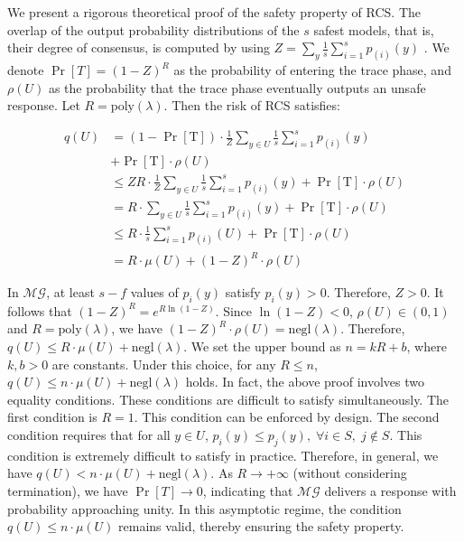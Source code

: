 We present a rigorous theoretical proof of the safety property of RCS. The overlap of the output probability distributions of the $s$ safest models, that is, their degree of consensus, is computed by using $Z = \sum_{y}\frac{1}{s}\sum_{i=1}^{s}p_{(i)}(y)$ \citep{kalai2025consensus}. We denote $\Pr[T]=(1-Z)^R$ as the probability of entering the trace phase, and $\rho(U)$ as the probability that the trace phase eventually outputs an unsafe response. Let $R = \mathrm{poly}(\lambda)$. Then the risk of RCS satisfies:

\begin{align*}
q(U) &= (1-\Pr[\text{T}]) \cdot \frac{1}{Z} \sum_{y \in U}\frac{1}{s}\sum_{i=1}^{s}p_{(i)}(y) \\ &+ \Pr[\text{T}] \cdot \rho(U)\\
&\leq  ZR \cdot \frac{1}{Z} \sum_{y \in U}\frac{1}{s}\sum_{i=1}^{s}p_{(i)}(y) + \Pr[\text{T}] \cdot \rho(U)\\
&=  R \cdot \sum_{y \in U}\frac{1}{s}\sum_{i=1}^{s}p_{(i)}(y) + \Pr[\text{T}] \cdot \rho(U)\\
&\leq R \cdot \frac{1}{s}\sum_{i=1}^{s}p_{(i)}(U) + \Pr[\text{T}] \cdot \rho(U) \\
&= R \cdot\mu(U) + (1-Z)^R \cdot \rho(U)
\end{align*}

In $\mathcal{MG}$, at least $s - f$ values of $p_i(y)$ satisfy $p_i(y) > 0$. Therefore, $Z > 0$. It follows that
$(1-Z)^R = e^{R \ln(1-Z)}$. Since $\ln(1-Z) < 0$, $\rho(U) \in (0,1)$ and $R = \mathrm{poly}(\lambda)$, we have $(1-Z)^R \cdot \rho(U) = \mathrm{negl}(\lambda)$. Therefore, $q(U) \leq R \cdot \mu(U) + \text{negl}(\lambda)$. We set the upper bound as $n = k R + b$, where $k,b > 0$ are constants. Under this choice, for any $R \le n$, $q(U) \le n \cdot \mu(U) + \mathrm{negl}(\lambda)$ holds. In fact, the above proof involves two equality conditions. These conditions are difficult to satisfy simultaneously. The first condition is $R = 1$. This condition can be enforced by design. The second condition requires that for all $y \in U$,
$p_i(y) \le p_j(y), \; \forall i \in S,\; j \notin S .$
This condition is extremely difficult to satisfy in practice. Therefore, in general, we have $q(U) < n \cdot \mu(U) + \mathrm{negl}(\lambda)$. As $R \to +\infty$ (without considering termination), we have $\Pr[T] \to 0$, indicating that $\mathcal{MG}$ delivers a response with probability approaching unity. In this asymptotic regime, the condition $q(U) \le n \cdot \mu(U)$ remains valid, thereby ensuring the safety property.

